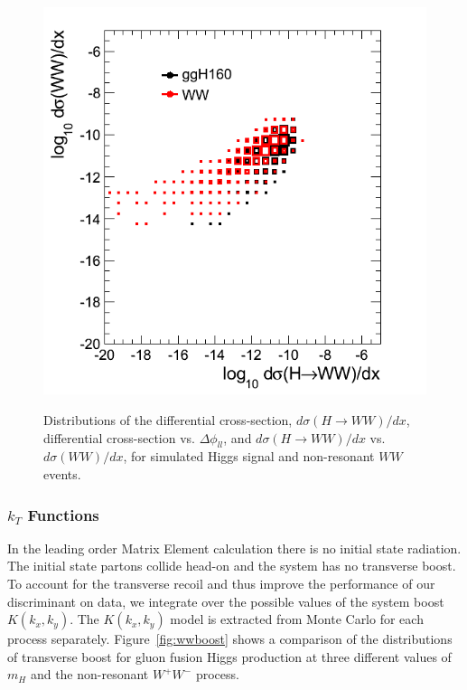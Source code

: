 \begin{figure}[!hbtp]
{\includegraphics[width=.42\textwidth]{figures/Xsec_WWvsHWW.png}}\\                                            
\caption{Distributions of  the differential cross-section, $d\sigma(H \rightarrow WW)/dx$, 
 differential cross-section vs. $\Delta\phi_{ll}$, and 
  $d\sigma(H \rightarrow WW)/dx$ vs. $d\sigma(WW)/dx$, 
for simulated Higgs signal and non-resonant $WW$ events.}
\label{fig:dXsecPlots}                                                                                          
\end{figure}                      

\subsubsection{$k_{T}$ Functions} 
In the leading order Matrix Element calculation there is no initial state radiation. The initial state partons 
collide head-on and the system has no transverse boost. To account for the transverse recoil and thus improve the performance 
of our discriminant on data, we integrate over the possible values of the system boost $K(k_x,k_y)$. The $K(k_x,k_y)$ model
is extracted from Monte Carlo for each process separately. Figure~\ref{fig:wwboost} shows a comparison of the distributions
of transverse boost for gluon fusion Higgs production at three different values of $m_H$ and the 
non-resonant $W^{+}W^{-}$ process.

